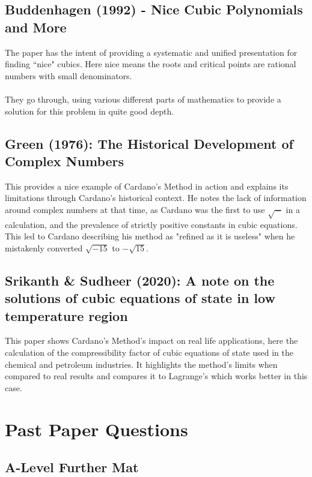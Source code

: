 \documentclass[12pt]{article}
\begin{document}
\subsection{Buddenhagen (1992) - Nice Cubic Polynomials and More}
The paper has the intent of providing a systematic and unified presentation for finding ``nice" cubics. Here nice means the roots and critical points are rational numbers with small denominators.\\\\
They go through, using various different parts of mathematics to provide a solution for this problem in quite good depth.


\subsection{Green (1976): The Historical Development of Complex Numbers}
This provides a nice example of Cardano's Method in action and explains its limitations through Cardano's historical context. He notes the lack of information around complex numbers at that time, as Cardano was the first to use $\sqrt{-}$ in a calculation, and the prevalence of strictly positive constants in cubic equations. This led to Cardano describing his method as "refined as it is useless" when he mistakenly converted $\sqrt{-15}$ to $- \sqrt{15}$.

\subsection{Srikanth \& Sudheer (2020): A note on the solutions of cubic equations of state in low temperature region}
This paper shows Cardano's Method's impact on real life applications, here the calculation of the compressibility factor of cubic equations of state used in the chemical and petroleum industries. It highlights the method's limits when compared to real results and compares it to Lagrange's which works better in this case. 



\section{Past Paper Questions}

\subsection{A-Level Further Mat}


\pagebreak 

\nocite{*}
\printbibliography{}
\end{document}
